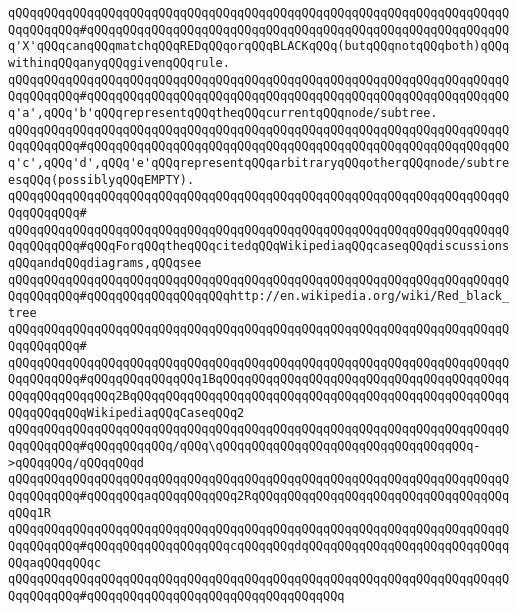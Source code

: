 \verb|qQQqqQQqqQQqqQQqqQQqqQQqqQQqqQQqqQQqqQQqqQQqqQQqqQQqqQQqqQQqqQQqqQQqqQQqqQQqqQQq#qQQqqQQqqQQqqQQqqQQqqQQqqQQqqQQqqQQqqQQqqQQqqQQqqQQqqQQqqQQq'X'qQQqcanqQQqmatchqQQqREDqQQqorqQQqBLACKqQQq(butqQQqnotqQQqboth)qQQqwithinqQQqanyqQQqgivenqQQqrule.|\newline
\verb|qQQqqQQqqQQqqQQqqQQqqQQqqQQqqQQqqQQqqQQqqQQqqQQqqQQqqQQqqQQqqQQqqQQqqQQqqQQqqQQq#qQQqqQQqqQQqqQQqqQQqqQQqqQQqqQQqqQQqqQQqqQQqqQQqqQQqqQQqqQQq'a',qQQq'b'qQQqrepresentqQQqtheqQQqcurrentqQQqnode/subtree.|\newline
\verb|qQQqqQQqqQQqqQQqqQQqqQQqqQQqqQQqqQQqqQQqqQQqqQQqqQQqqQQqqQQqqQQqqQQqqQQqqQQqqQQq#qQQqqQQqqQQqqQQqqQQqqQQqqQQqqQQqqQQqqQQqqQQqqQQqqQQqqQQqqQQq'c',qQQq'd',qQQq'e'qQQqrepresentqQQqarbitraryqQQqotherqQQqnode/subtreesqQQq(possiblyqQQqEMPTY).|\newline
\verb|qQQqqQQqqQQqqQQqqQQqqQQqqQQqqQQqqQQqqQQqqQQqqQQqqQQqqQQqqQQqqQQqqQQqqQQqqQQqqQQq#|\newline
\verb|qQQqqQQqqQQqqQQqqQQqqQQqqQQqqQQqqQQqqQQqqQQqqQQqqQQqqQQqqQQqqQQqqQQqqQQqqQQqqQQq#qQQqForqQQqtheqQQqcitedqQQqWikipediaqQQqcaseqQQqdiscussionsqQQqandqQQqdiagrams,qQQqsee|\newline
\verb|qQQqqQQqqQQqqQQqqQQqqQQqqQQqqQQqqQQqqQQqqQQqqQQqqQQqqQQqqQQqqQQqqQQqqQQqqQQqqQQq#qQQqqQQqqQQqqQQqqQQqhttp://en.wikipedia.org/wiki/Red_black_tree|\newline
\newline
\verb|qQQqqQQqqQQqqQQqqQQqqQQqqQQqqQQqqQQqqQQqqQQqqQQqqQQqqQQqqQQqqQQqqQQqqQQqqQQqqQQq#|\newline
\verb|qQQqqQQqqQQqqQQqqQQqqQQqqQQqqQQqqQQqqQQqqQQqqQQqqQQqqQQqqQQqqQQqqQQqqQQqqQQqqQQq#qQQqqQQqqQQqqQQq1BqQQqqQQqqQQqqQQqqQQqqQQqqQQqqQQqqQQqqQQqqQQqqQQqqQQqqQQq2BqQQqqQQqqQQqqQQqqQQqqQQqqQQqqQQqqQQqqQQqqQQqqQQqqQQqqQQqqQQqqQQqWikipediaqQQqCaseqQQq2|\newline
\verb|qQQqqQQqqQQqqQQqqQQqqQQqqQQqqQQqqQQqqQQqqQQqqQQqqQQqqQQqqQQqqQQqqQQqqQQqqQQqqQQq#qQQqqQQqqQQq/qQQq\qQQqqQQqqQQqqQQqqQQqqQQqqQQqqQQqqQQq->qQQqqQQq/qQQqqQQqd|\newline
\verb|qQQqqQQqqQQqqQQqqQQqqQQqqQQqqQQqqQQqqQQqqQQqqQQqqQQqqQQqqQQqqQQqqQQqqQQqqQQqqQQq#qQQqqQQqaqQQqqQQqqQQq2RqQQqqQQqqQQqqQQqqQQqqQQqqQQqqQQqqQQqqQQq1R|\newline
\verb|qQQqqQQqqQQqqQQqqQQqqQQqqQQqqQQqqQQqqQQqqQQqqQQqqQQqqQQqqQQqqQQqqQQqqQQqqQQqqQQq#qQQqqQQqqQQqqQQqqQQqcqQQqqQQqdqQQqqQQqqQQqqQQqqQQqqQQqqQQqqQQqaqQQqqQQqc|\newline
\verb|qQQqqQQqqQQqqQQqqQQqqQQqqQQqqQQqqQQqqQQqqQQqqQQqqQQqqQQqqQQqqQQqqQQqqQQqqQQqqQQq#qQQqqQQqqQQqqQQqqQQqqQQqqQQqqQQqqQQq|\newline
